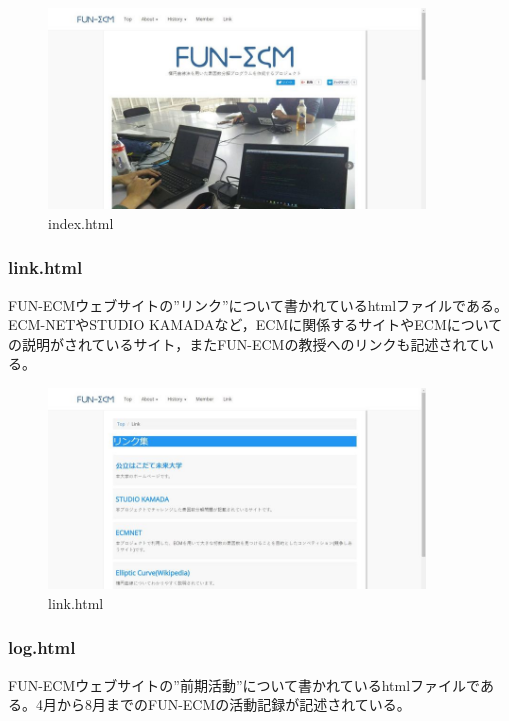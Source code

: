 \documentclass[openany,11pt,papersize]{jsbook}
\begin{document}
\begin{figure}[H]
  \begin{center} %
    \includegraphics[clip, width=10.0cm]{./figure/index.png}
    \caption{index.html} %
    \label{index} %
  \end{center}
\end{figure}

\subsubsection{link.html}
FUN-ECMウェブサイトの”リンク”について書かれているhtmlファイルである。ECM-NETやSTUDIO KAMADAなど，ECMに関係するサイトやECMについての説明がされているサイト，またFUN-ECMの教授へのリンクも記述されている。

\begin{figure}[H]
  \begin{center} %
    \includegraphics[clip, width=10.0cm]{./figure/link.png}
    \caption{link.html} %
    \label{link} %
  \end{center}
\end{figure}

\subsubsection{log.html}
FUN-ECMウェブサイトの”前期活動”について書かれているhtmlファイルである。4月から8月までのFUN-ECMの活動記録が記述されている。
\end{document}
